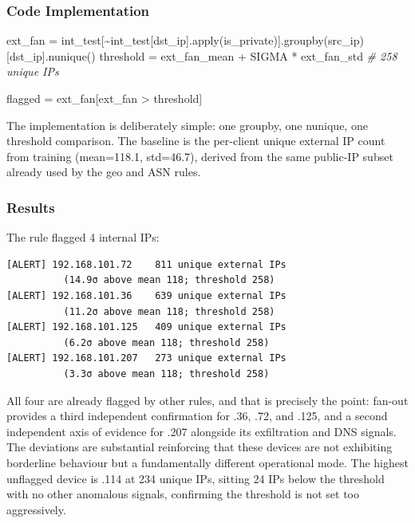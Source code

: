 \documentclass[
  11pt,
]{article}
\newenvironment{Shaded}{\vspace{4pt}}{\vspace{4pt}}
\newcommand{\BuiltInTok}[1]{\textcolor[rgb]{0.00,0.50,0.00}{#1}}
\newcommand{\CommentTok}[1]{\textcolor[rgb]{0.38,0.63,0.69}{\textit{#1}}}
\newcommand{\NormalTok}[1]{#1}
\newcommand{\OperatorTok}[1]{\textcolor[rgb]{0.40,0.40,0.40}{#1}}
\newcommand{\StringTok}[1]{\textcolor[rgb]{0.25,0.44,0.63}{#1}}
\begin{document}
\subsubsection{Code Implementation}

\begin{Shaded}
\begin{Highlighting}[]
\NormalTok{ext\_fan }\OperatorTok{=}\NormalTok{ int\_test[}\OperatorTok{\textasciitilde{}}\NormalTok{int\_test[}\StringTok{\textquotesingle{}dst\_ip\textquotesingle{}}\NormalTok{].}\BuiltInTok{apply}\NormalTok{(is\_private)].groupby(}\StringTok{\textquotesingle{}src\_ip\textquotesingle{}}\NormalTok{)[}\StringTok{\textquotesingle{}dst\_ip\textquotesingle{}}\NormalTok{].nunique()}
\NormalTok{threshold }\OperatorTok{=}\NormalTok{ ext\_fan\_mean }\OperatorTok{+}\NormalTok{ SIGMA }\OperatorTok{*}\NormalTok{ ext\_fan\_std  }\CommentTok{\# 258 unique IPs}

\NormalTok{flagged }\OperatorTok{=}\NormalTok{ ext\_fan[ext\_fan }\OperatorTok{\textgreater{}}\NormalTok{ threshold]}
\end{Highlighting}
\end{Shaded}

The implementation is deliberately simple: one groupby, one nunique, one
threshold comparison. The baseline is the per-client unique external IP
count from training (mean=118.1, std=46.7), derived from the same
public-IP subset already used by the geo and ASN rules.

\subsubsection{Results}


The rule flagged 4 internal IPs:

\begin{verbatim}
[ALERT] 192.168.101.72    811 unique external IPs
          (14.9σ above mean 118; threshold 258)
[ALERT] 192.168.101.36    639 unique external IPs
          (11.2σ above mean 118; threshold 258)
[ALERT] 192.168.101.125   409 unique external IPs
          (6.2σ above mean 118; threshold 258)
[ALERT] 192.168.101.207   273 unique external IPs
          (3.3σ above mean 118; threshold 258)
\end{verbatim}

All four are already flagged by other rules, and that is precisely the
point: fan-out provides a third independent confirmation for .36, .72,
and .125, and a second independent axis of evidence for .207 alongside
its exfiltration and DNS signals. The deviations are substantial reinforcing that these devices are not exhibiting borderline behaviour
but a fundamentally different operational mode. The highest unflagged
device is .114 at 234 unique IPs, sitting 24 IPs below the threshold
with no other anomalous signals, confirming the threshold is not set too
aggressively.
\end{document}
